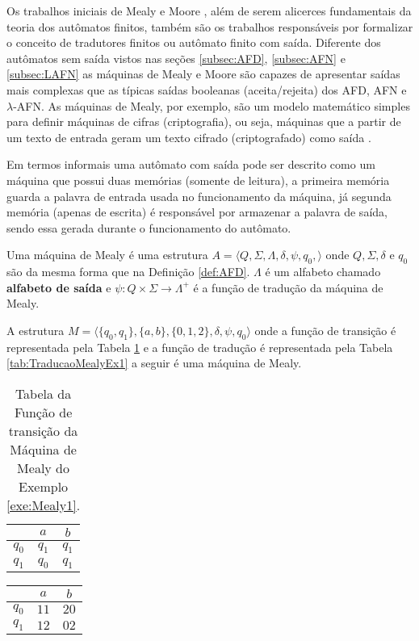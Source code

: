 Os trabalhos iniciais de Mealy \cite{mealy1955} e Moore \cite{moore1956}, além de serem alicerces fundamentais da teoria dos autômatos finitos, também são os trabalhos responsáveis por formalizar o conceito de tradutores finitos ou autômato finito com saída. Diferente dos autômatos sem saída vistos nas seções \ref{subsec:AFD}, \ref{subsec:AFN} e \ref{subsec:LAFN} as máquinas de Mealy e Moore são capazes de apresentar saídas mais complexas que as típicas saídas booleanas (aceita/rejeita) dos AFD, AFN e $\lambda$-AFN. As máquinas de Mealy, por exemplo,  são um modelo matemático simples para definir máquinas de cifras (criptografia), ou seja, máquinas que a partir de um texto de entrada geram um texto cifrado (criptografado) como saída \cite{menezes1998LFA}.

Em termos informais uma autômato com saída pode ser descrito como um máquina que possui duas memórias (somente de leitura), a primeira memória guarda a palavra de entrada usada no funcionamento da máquina, já segunda memória (apenas de escrita) é responsável por armazenar a palavra de saída, sendo essa gerada durante o funcionamento do autômato.

\begin{definition}\label{def:MealyMachine}
	Uma máquina de Mealy é uma estrutura $A = \langle Q, \Sigma, \Lambda, \delta, \psi, q_0, \rangle$ onde $Q, \Sigma, \delta$ e $q_0$ são da mesma forma que na Definição \ref{def:AFD}. $\Lambda$ é um alfabeto chamado \textbf{alfabeto de saída} e $\psi: Q \times \Sigma \rightarrow \Lambda^+$ é a função de tradução da máquina de Mealy.
\end{definition}

\begin{example}\label{exe:Mealy1}
	A estrutura $M = \langle \{q_0, q_1\}, \{a, b\}, \{0, 1, 2\}, \delta, \psi, q_0 \rangle$ onde a função de transição é representada pela Tabela \ref{tab:TransicaoMealyEx1} e a função de tradução é representada pela Tabela \ref{tab:TraducaoMealyEx1} a seguir é uma máquina de Mealy.
	
	\begin{table}[h]
		\centering
		\begin{tabular}{c|cc}
			\backslashbox{$Q$}{$\Sigma$} & $a$ & $b$\\ \hline
			$q_0$ & $q_1$ & $q_1$ \\
			$q_1$ & $q_0$ & $q_1$
		\end{tabular}
		\caption{Tabela da Função de transição da Máquina de Mealy do Exemplo \ref{exe:Mealy1}.}
		\label{tab:TransicaoMealyEx1}
	\end{table}
	
	\begin{table*}[h]
		\centering
		\begin{tabular}{c|cc}
			\backslashbox{$Q$}{$\Sigma$} & $a$ & $b$\\ \hline
			$q_0$ & $11$ & $20$ \\
			$q_1$ & $12$ & $02$ 
		\end{tabular}
		\caption{Tabela da Função de tradução da Máquina de Mealy do Exemplo \ref{exe:Mealy1}.}
		\label{tab:TraducaoMealyEx1}
	\end{table*}
\end{example}

